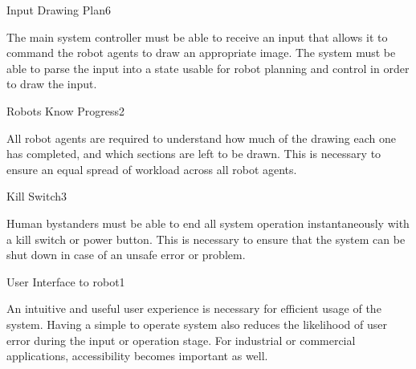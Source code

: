 \begin{functional_requirement}{Input Drawing Plan}{6}
\label{fr:input_plan}
\item The main system controller must be able to receive an input that allows it to command the robot agents to draw an appropriate image. The system must be able to parse the input into a state usable for robot planning and control in order to draw the input. 
\end{functional_requirement}

\begin{functional_requirement}{Robots Know Progress}{2}
\label{fr:know_progress}
\item All robot agents are required to understand how much of the drawing each one has completed, and which sections are left to be drawn. This is necessary to ensure an equal spread of workload across all robot agents. 
\end{functional_requirement}

\begin{functional_requirement}{Kill Switch}{3}
\label{fr:kill_switch}
\item Human bystanders must be able to end all system operation instantaneously with a kill switch or power button. This is necessary to ensure that the system can be shut down in case of an unsafe error or problem. 
\end{functional_requirement}

\begin{functional_requirement}{User Interface to robot}{1}
\label{fr:user_interface}
\item An intuitive and useful user experience is necessary for efficient usage of the system. Having a simple to operate system also reduces the likelihood of user error during the input or operation stage. For industrial or commercial applications, accessibility becomes important as well. 
\end{functional_requirement}



